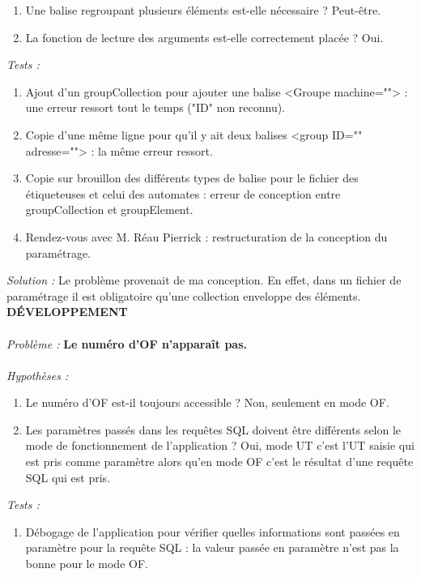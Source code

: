 \documentclass[a4paper,12pt]{extarticle}
\begin{document}
\begin{enumerate}[-]
    \item Une balise regroupant plusieurs éléments est-elle nécessaire ? Peut-être.
    \item La fonction de lecture des arguments est-elle correctement placée ? Oui.
\end{enumerate}

\emph{Tests :}

\begin{enumerate}[-]
    \item Ajout d'un groupCollection pour ajouter une balise <Groupe machine=""> : une erreur ressort tout le temps ("ID" non reconnu).
    \item Copie d'une même ligne pour qu'il y ait deux balises <group ID="" adresse=""> : la même erreur ressort.
    \item Copie sur brouillon des différents types de balise pour le fichier des étiqueteuses et celui des automates : erreur de conception entre groupCollection et groupElement.
    \item Rendez-vous avec M. Réau Pierrick : restructuration de la conception du paramétrage.
\end{enumerate}

\emph{Solution :} Le problème provenait de ma conception. En effet, dans un fichier de paramétrage il est obligatoire qu’une collection enveloppe des éléments.\\

\textbf{DÉVELOPPEMENT}\\
\\
\emph{Problème :} \textbf{Le numéro d’OF n'apparaît pas.}\\
\\
\emph{Hypothèses :}

\begin{enumerate}[-]
    \item Le numéro d’OF est-il toujours accessible ? Non, seulement en mode OF.
    \item Les paramètres passés dans les requêtes SQL doivent être différents selon le mode de fonctionnement de l’application ? Oui, mode UT c’est l’UT saisie qui est pris comme paramètre alors qu’en mode OF c’est le résultat d’une requête SQL qui est pris.
\end{enumerate}

\emph{Tests :}

\begin{enumerate}[-]
    \item Débogage de l’application pour vérifier quelles informations sont passées en paramètre pour la requête SQL : la valeur passée en paramètre n’est pas la bonne pour le mode OF.
\end{enumerate}
\end{document}

